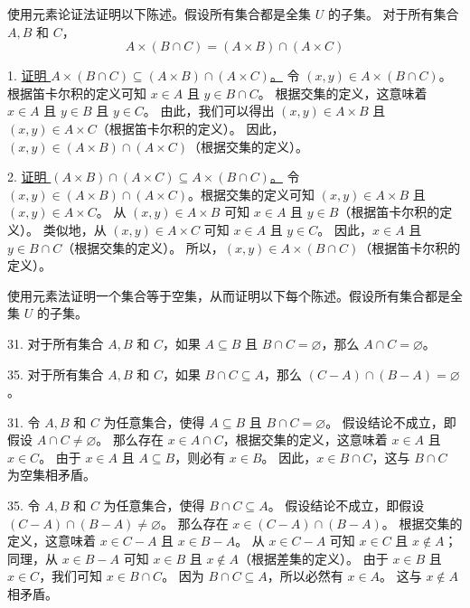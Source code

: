 \begin{questions}
    \question
使用元素论证法证明以下陈述。假设所有集合都是全集 $U$ 的子集。
对于所有集合 $A, B$ 和 $C$，
\[
A \times (B \cap C) = (A \times B) \cap (A \times C)
\]

\begin{solution}
1. \underline{证明 $A \times (B \cap C) \subseteq (A \times B) \cap (A \times C)$。}
令 $(x, y) \in A \times (B \cap C)$。根据笛卡尔积的定义可知 $x \in A$ 且 $y \in B \cap C$。
根据交集的定义，这意味着 $x \in A$ 且 $y \in B$ 且 $y \in C$。
由此，我们可以得出 $(x, y) \in A \times B$ 且 $(x, y) \in A \times C$（根据笛卡尔积的定义）。
因此，$(x, y) \in (A \times B) \cap (A \times C)$（根据交集的定义）。

2. \underline{证明 $(A \times B) \cap (A \times C) \subseteq A \times (B \cap C)$。}
令 $(x, y) \in (A \times B) \cap (A \times C)$。根据交集的定义可知 $(x, y) \in A \times B$ 且 $(x, y) \in A \times C$。
从 $(x, y) \in A \times B$ 可知 $x \in A$ 且 $y \in B$（根据笛卡尔积的定义）。
类似地，从 $(x, y) \in A \times C$ 可知 $x \in A$ 且 $y \in C$。
因此，$x \in A$ 且 $y \in B \cap C$（根据交集的定义）。
所以，$(x, y) \in A \times (B \cap C)$（根据笛卡尔积的定义）。
\end{solution}

\question
使用元素法证明一个集合等于空集，从而证明以下每个陈述。假设所有集合都是全集 $U$ 的子集。

31. 对于所有集合 $A, B$ 和 $C$，如果 $A \subseteq B$ 且 $B \cap C = \varnothing$，那么 $A \cap C = \varnothing$。

35. 对于所有集合 $A, B$ 和 $C$，如果 $B \cap C \subseteq A$，那么 $(C - A) \cap (B - A) = \varnothing$。

\begin{solution}
31. 令 $A, B$ 和 $C$ 为任意集合，使得 $A \subseteq B$ 且 $B \cap C = \varnothing$。
假设结论不成立，即假设 $A \cap C \neq \varnothing$。
那么存在 $x \in A \cap C$，根据交集的定义，这意味着 $x \in A$ 且 $x \in C$。
由于 $x \in A$ 且 $A \subseteq B$，则必有 $x \in B$。
因此，$x \in B \cap C$，这与 $B \cap C$ 为空集相矛盾。

35. 令 $A, B$ 和 $C$ 为任意集合，使得 $B \cap C \subseteq A$。
假设结论不成立，即假设 $(C - A) \cap (B - A) \neq \varnothing$。
那么存在 $x \in (C - A) \cap (B - A)$。
根据交集的定义，这意味着 $x \in C - A$ 且 $x \in B - A$。
从 $x \in C - A$ 可知 $x \in C$ 且 $x \notin A$；同理，从 $x \in B - A$ 可知 $x \in B$ 且 $x \notin A$（根据差集的定义）。
由于 $x \in B$ 且 $x \in C$，我们可知 $x \in B \cap C$。
因为 $B \cap C \subseteq A$，所以必然有 $x \in A$。
这与 $x \notin A$ 相矛盾。
\end{solution}


\end{questions}
